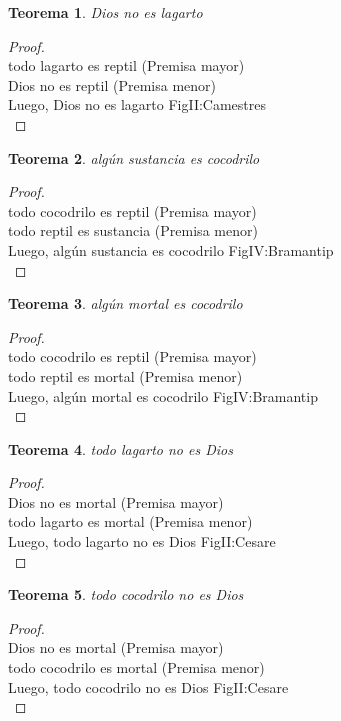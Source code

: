 ﻿\documentclass[12pt]{book}
\newtheorem{theorem}{Teorema}[chapter]
\newtheorem{proof}{Demostración}
\begin{document}
\begin{theorem}
Dios no es lagarto
\label{th: 122}
\end{theorem}\begin{proof}\\todo lagarto es reptil	 (Premisa mayor) \\Dios no es reptil	 (Premisa menor) \\Luego, Dios no es lagarto	FigII:Camestres \\ \end{proof}
\begin{theorem}
algún sustancia es cocodrilo
\label{th: 123}
\end{theorem}\begin{proof}\\todo cocodrilo es reptil	 (Premisa mayor) \\todo reptil es sustancia	 (Premisa menor) \\Luego, algún sustancia es cocodrilo	FigIV:Bramantip \\ \end{proof}
\begin{theorem}
algún mortal es cocodrilo
\label{th: 124}
\end{theorem}\begin{proof}\\todo cocodrilo es reptil	 (Premisa mayor) \\todo reptil es mortal	 (Premisa menor) \\Luego, algún mortal es cocodrilo	FigIV:Bramantip \\ \end{proof}
\begin{theorem}
todo lagarto no es Dios
\label{th: 125}
\end{theorem}\begin{proof}\\Dios no es mortal	 (Premisa mayor) \\todo lagarto es mortal	 (Premisa menor) \\Luego, todo lagarto no es Dios	FigII:Cesare \\ \end{proof}
\begin{theorem}
todo cocodrilo no es Dios
\label{th: 126}
\end{theorem}\begin{proof}\\Dios no es mortal	 (Premisa mayor) \\todo cocodrilo es mortal	 (Premisa menor) \\Luego, todo cocodrilo no es Dios	FigII:Cesare \\ \end{proof}
\end{document}
